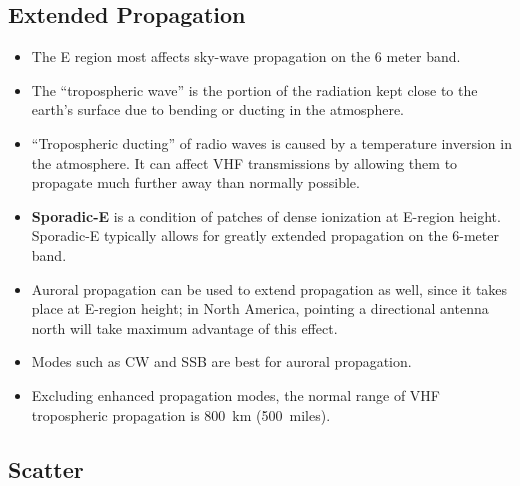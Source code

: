 \documentclass[letterpaper,12pt]{scrartcl}
\begin{document}
\subsection{Extended Propagation}

\begin{itemize}
\item The E region most affects sky-wave propagation on the 6 meter band.
  \item The ``tropospheric wave'' is the portion of the radiation kept close to the earth's surface due to bending or ducting in the atmosphere.
\item ``Tropospheric ducting'' of radio waves is caused by a temperature inversion in the atmosphere. It can affect VHF transmissions
  by allowing them to propagate much further away than normally possible.
\item \textbf{Sporadic-E} is a condition of patches of dense ionization at E-region height. Sporadic-E typically allows for greatly extended propagation on the 6-meter band.
\item Auroral propagation can be used to extend propagation as well, since
  it takes place at E-region height; in North America, pointing a directional antenna north will take maximum advantage of this effect.
\item Modes such as CW and SSB are best for auroral propagation.
\item Excluding enhanced propagation modes, the normal range of VHF tropospheric propagation is 800~km (500~miles).
\end{itemize}

\subsection{Scatter}
\end{document}
